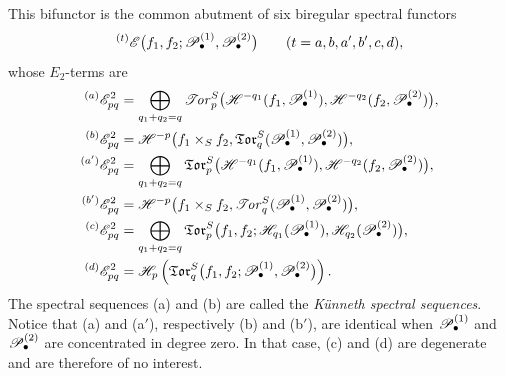 \begin{theorem}[6.7.3]
This bifunctor is the common abutment of six biregular spectral
functors
\[
  {}^{(t)}\mathscr{E}
  \bigl(
    f_1,f_2;
    \mathscr{P}_\bullet^{(1)},\mathscr{P}_\bullet^{(2)}
  \bigr)
  \qquad(t=a,b,a',b',c,d),
\]
whose $E_2$-terms are
\[
\begin{aligned}
  {}^{(a)}\mathscr{E}_{pq}^2
  &=
  \bigoplus_{q_1+q_2=q}
  \mathscr{T}\!\mathit{or}_p^S
  \bigl(
    \mathscr{H}^{-q_1}(f_1,\mathscr{P}_\bullet^{(1)}),
    \mathscr{H}^{-q_2}(f_2,\mathscr{P}_\bullet^{(2)})
  \bigr),\\
  {}^{(b)}\mathscr{E}_{pq}^2
  &=
  \mathscr{H}^{-p}
  \bigl(
    f_1\times_Sf_2,
    \mathfrak{Tor}_q^S
    (\mathscr{P}_\bullet^{(1)},\mathscr{P}_\bullet^{(2)})
  \bigr),\\
  {}^{(a')}\mathscr{E}_{pq}^2
  &=
  \bigoplus_{q_1+q_2=q}
  \mathfrak{Tor}_p^S
  \bigl(
    \mathscr{H}^{-q_1}(f_1,\mathscr{P}_\bullet^{(1)}),
    \mathscr{H}^{-q_2}(f_2,\mathscr{P}_\bullet^{(2)})
  \bigr),\\
  {}^{(b')}\mathscr{E}_{pq}^2
  &=
  \mathscr{H}^{-p}
  \bigl(
    f_1\times_Sf_2,
    \mathscr{T}\!\mathit{or}_q^S
    (\mathscr{P}_\bullet^{(1)},\mathscr{P}_\bullet^{(2)})
  \bigr),\\
  {}^{(c)}\mathscr{E}_{pq}^2
  &=
  \bigoplus_{q_1+q_2=q}
  \mathfrak{Tor}_p^S
  \bigl(
    f_1,f_2;
    \mathscr{H}_{q_1}(\mathscr{P}_\bullet^{(1)}),
    \mathscr{H}_{q_2}(\mathscr{P}_\bullet^{(2)})
  \bigr),\\
  {}^{(d)}\mathscr{E}_{pq}^2
  &=
  \mathscr{H}_p
  \left(
    \mathfrak{Tor}_q^S
    \bigl(
      f_1,f_2;
      \mathscr{P}_\bullet^{(1)},\mathscr{P}_\bullet^{(2)}
    \bigr)
  \right).
\end{aligned}
\]
The spectral sequences \textnormal{(a)} and \textnormal{(b)} are
called the \emph{K\"unneth spectral sequences}.  Notice that
\textnormal{(a)} and \textnormal{(a$'$)}, respectively
\textnormal{(b)} and \textnormal{(b$'$)}, are identical when
$\mathscr{P}_\bullet^{(1)}$ and $\mathscr{P}_\bullet^{(2)}$ are concentrated
in degree zero.  In that case, \textnormal{(c)} and
\textnormal{(d)} are degenerate and are therefore of no
interest.
\end{theorem}

